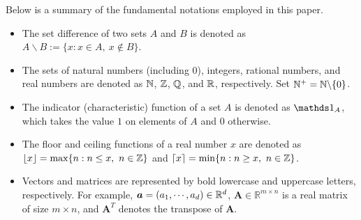 \documentclass[nohyperref]{article}
\theoremstyle{plain}
\theoremstyle{definition}
\theoremstyle{remark}
\begin{document}
Below is a summary of the fundamental notations employed in this paper.
\begin{itemize}
	\item The set difference of two sets $A$ and $B$ is denoted as $A\backslash B:=\{x:x\in A,\ x\notin B\}$. 
 
	\item The sets of natural numbers (including $0$), integers, rational numbers, and real numbers are denoted as $\N$, $\Z$, $\Q$, and $\R$, respectively. Set $\N^+=\N\backslash\{0\}$.


 	\item The indicator (characteristic) function of a set $A$ is denoted as $\one_{A}$,  which takes the value $1$ on elements of $A$ and $0$ otherwise.
	
	
	\item The floor and ceiling functions of a real number $x$ are denoted as 
 $\lfloor x\rfloor=\max \{n: n\le x,\ n\in \Z\}$ and $\lceil x\rceil=\min \{n: n\ge x,\ n\in \Z\}$.
	

	
	

	
	\item 	Vectors and matrices are represented by bold lowercase and uppercase letters, respectively. For example,
	$\bma=(a_1,\dotsc,a_d)\in\R^d$,
 $\bm{A}\in\mathbb{R}^{m\times n}$ is a real matrix of size $m\times n$, and $\bm{A}^T$ denotes the transpose of $\bm{A}$.  


\end{itemize}
\end{document}
